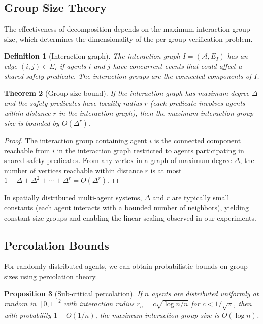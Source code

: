 \documentclass[11pt]{article}
\newtheorem{theorem}{Theorem}[section]
\newtheorem{proposition}[theorem]{Proposition}
\newtheorem{definition}[theorem]{Definition}
\newcommand{\calA}{\mathcal{A}}
\begin{document}
\subsection{Group Size Theory}

The effectiveness of decomposition depends on the maximum interaction group
size, which determines the dimensionality of the per-group verification problem.

\begin{definition}[Interaction graph]
The \emph{interaction graph} $I = (\calA, E_I)$ has an edge $(i,j) \in E_I$
if agents $i$ and $j$ have concurrent events that could affect a shared
safety predicate. The interaction groups are the connected components of $I$.
\end{definition}

\begin{theorem}[Group size bound]
\label{thm:group-size}
If the interaction graph has maximum degree $\Delta$ and the safety
predicates have locality radius $r$ (each predicate involves agents within
distance $r$ in the interaction graph), then the maximum interaction group
size is bounded by $O(\Delta^r)$.
\end{theorem}

\begin{proof}
The interaction group containing agent $i$ is the connected component
reachable from $i$ in the interaction graph restricted to agents
participating in shared safety predicates. From any vertex in a graph
of maximum degree $\Delta$, the number of vertices reachable within
distance $r$ is at most $1 + \Delta + \Delta^2 + \cdots + \Delta^r
= O(\Delta^r)$.
\end{proof}

In spatially distributed multi-agent systems, $\Delta$ and $r$ are typically
small constants (each agent interacts with a bounded number of neighbors),
yielding constant-size groups and enabling the linear scaling observed in
our experiments.

\subsection{Percolation Bounds}

For randomly distributed agents, we can obtain probabilistic bounds on
group sizes using percolation theory.

\begin{proposition}[Sub-critical percolation]
\label{prop:percolation}
If $n$ agents are distributed uniformly at random in $[0,1]^2$ with
interaction radius $r_n = c \sqrt{\log n / n}$ for $c < 1/\sqrt{\pi}$,
then with probability $1 - O(1/n)$, the maximum interaction group size
is $O(\log n)$.
\end{proposition}
\end{document}
